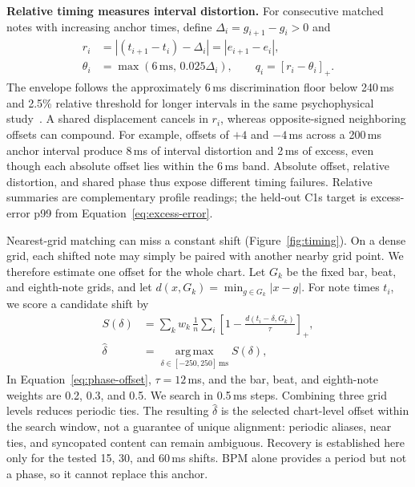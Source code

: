 \documentclass[10pt,twocolumn]{article}
\newcommand{\figref}[1]{Figure~\ref{#1}}
\begin{document}
\textbf{Relative timing measures interval distortion.}
For consecutive matched notes with increasing anchor times, define
$\Delta_i=g_{i+1}-g_i>0$ and
\begin{equation}
\begin{aligned}
 r_i
 &= |(t_{i+1}-t_i)-\Delta_i|
  = |e_{i+1}-e_i|,\\
 \theta_i&=\max(6\,\mathrm{ms},\,0.025\Delta_i),\qquad
 q_i=[r_i-\theta_i]_+.
\end{aligned}
\label{eq:relative-excess}
\end{equation}
The envelope follows the approximately 6\,ms discrimination floor below
240\,ms and 2.5\% relative threshold for longer intervals in the same
psychophysical study~\cite{friberg1995jnd}.
A shared displacement cancels in $r_i$, whereas opposite-signed neighboring
offsets can compound. For example, offsets of $+4$ and $-4$\,ms across a
200\,ms anchor interval produce 8\,ms of interval distortion and 2\,ms of
excess, even though each absolute offset lies within the 6\,ms band.
Absolute offset, relative distortion, and shared phase thus expose different
timing failures. Relative summaries are complementary profile readings;
the held-out C1s target is excess-error p99 from Equation~\ref{eq:excess-error}.

Nearest-grid matching can miss a constant shift (\figref{fig:timing}).
On a dense grid, each shifted note may simply be paired with another
nearby grid point. We therefore estimate one offset for the whole chart.
Let $G_k$ be the fixed bar, beat, and eighth-note grids, and let
$d(x,G_k)=\min_{g\in G_k}|x-g|$. For note times $t_i$, we score a
candidate shift by
\begin{equation}
\begin{aligned}
S(\delta)
 &= \sum_k w_k\,\frac{1}{n}\sum_i
 \left[1-\frac{d(t_i-\delta,G_k)}{\tau}\right]_+,\\
\hat{\delta}
 &= \operatorname*{arg\,max}_{\delta\in[-250,250]\,\mathrm{ms}}
 S(\delta),
\end{aligned}
\label{eq:phase-offset}
\end{equation}
In Equation~\ref{eq:phase-offset}, $\tau=12$\,ms, and the bar, beat, and
eighth-note weights are 0.2, 0.3, and 0.5. We search in 0.5\,ms steps.
Combining three grid levels reduces periodic ties. The resulting
$\hat\delta$ is the selected chart-level offset within the search window,
not a guarantee of unique alignment: periodic aliases, near ties, and
syncopated content can remain ambiguous. Recovery is established here only
for the tested 15, 30, and 60\,ms shifts. BPM alone provides a period but not
a phase, so it cannot replace this anchor.
\end{document}
